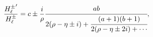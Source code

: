 \[\frac{\mathop{{H^{\pm}_{\ell}}\/}\nolimits'}{\mathop{{H^{\pm}_{\ell}}\/}%
\nolimits}=c\pm\frac{i}{\rho}\cfrac{ab}{2(\rho-\eta\pm i)+\cfrac{(a+1)(b+1)}{2%
(\rho-\eta\pm 2i)+\cdots}},\]